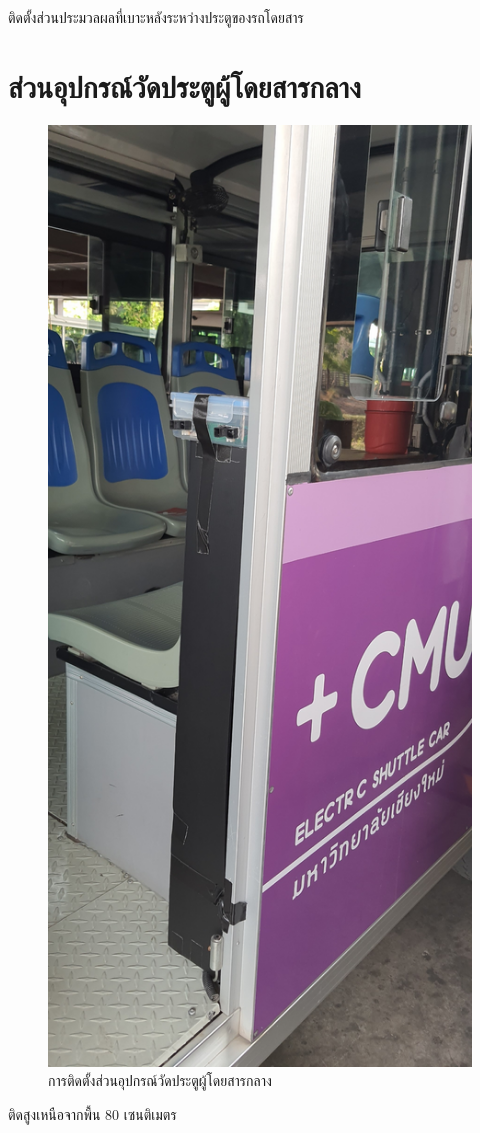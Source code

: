     ติดตั้งส่วนประมวลผลที่เบาะหลังระหว่างประตูของรถโดยสาร
\pagebreak
\section{ส่วนอุปกรณ์วัดประตูผู้โดยสารกลาง}
    \begin{figure}[h!]
        \begin{center}
        \includegraphics[width=\textwidth,angle=-90,origin=c]{install_front.jpg}
        \end{center}
        \caption{การติดตั้งส่วนอุปกรณ์วัดประตูผู้โดยสารกลาง}
        \label{fig:install_front}
    \end{figure}
    ติดสูงเหนือจากพื้น 80 เซนติเมตร
\pagebreak
